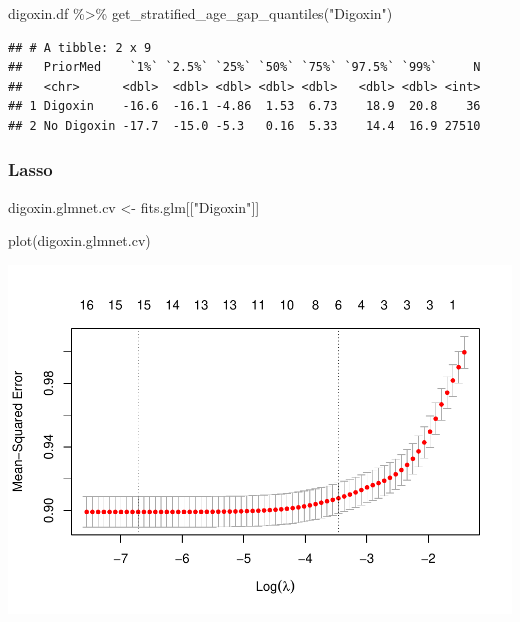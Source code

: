 \documentclass[
]{article}
\newenvironment{Shaded}{\begin{snugshade}}{\end{snugshade}}
\newcommand{\FunctionTok}[1]{\textcolor[rgb]{0.00,0.00,0.00}{#1}}
\newcommand{\NormalTok}[1]{#1}
\newcommand{\OtherTok}[1]{\textcolor[rgb]{0.56,0.35,0.01}{#1}}
\newcommand{\SpecialCharTok}[1]{\textcolor[rgb]{0.00,0.00,0.00}{#1}}
\newcommand{\StringTok}[1]{\textcolor[rgb]{0.31,0.60,0.02}{#1}}
\begin{document}
\begin{Shaded}
\begin{Highlighting}[]
\NormalTok{digoxin.df }\SpecialCharTok{\%\textgreater{}\%} 
  \FunctionTok{get\_stratified\_age\_gap\_quantiles}\NormalTok{(}\StringTok{"Digoxin"}\NormalTok{)}
\end{Highlighting}
\end{Shaded}

\begin{verbatim}
## # A tibble: 2 x 9
##   PriorMed    `1%` `2.5%` `25%` `50%` `75%` `97.5%` `99%`     N
##   <chr>      <dbl>  <dbl> <dbl> <dbl> <dbl>   <dbl> <dbl> <int>
## 1 Digoxin    -16.6  -16.1 -4.86  1.53  6.73    18.9  20.8    36
## 2 No Digoxin -17.7  -15.0 -5.3   0.16  5.33    14.4  16.9 27510
\end{verbatim}

\hypertarget{lasso-2}{%
\subsubsection{Lasso}\label{lasso-2}}

\begin{Shaded}
\begin{Highlighting}[]
\NormalTok{digoxin.glmnet.cv }\OtherTok{\textless{}{-}}\NormalTok{ fits.glm[[}\StringTok{"Digoxin"}\NormalTok{]]}
\end{Highlighting}
\end{Shaded}

\begin{Shaded}
\begin{Highlighting}[]
\FunctionTok{plot}\NormalTok{(digoxin.glmnet.cv) }
\end{Highlighting}
\end{Shaded}

\includegraphics{../results/report_files/figure-latex/digoxin-lasso-plot-1.pdf}
\end{document}

